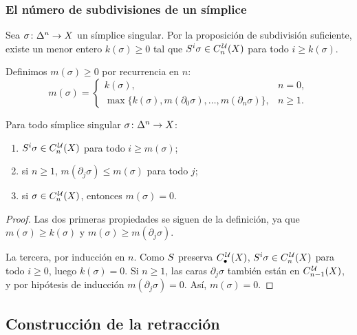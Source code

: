 \begin{frame}[allowframebreaks]
  \frametitle{El número de subdivisiones de un símplice}

  Sea $\sigma\colon\Delta^{n}\to X$ un símplice singular. Por la
  proposición de subdivisión suficiente, existe un menor entero $k(\sigma)\geq0$ tal que
  $S^i\sigma\in C^{\mkern2mu\mathcal{U}}_n(X)$ para todo $i\geq k(\sigma)$.

  \begin{definition}
    Definimos $m(\sigma)\geq0$ por recurrencia en $n$:
    \[
      m(\sigma)=
      \begin{cases}
        k(\sigma), & n=0,\\
        \max\bigl\{k(\sigma),m(\partial_0\sigma),\ldots,m(\partial_n\sigma)\bigr\},
          & n\geq1.
      \end{cases}
    \]
  \end{definition}

  \framebreak

  \begin{lemma}
    Para todo símplice singular $\sigma\colon\Delta^{n}\to X$:
    \begin{enumerate}
      \item $S^i\sigma\in C^{\mkern2mu\mathcal{U}}_n(X)$ para todo $i\geq m(\sigma)$;
      \item si $n\geq1$, $m(\partial_j\sigma)\leq m(\sigma)$ para todo $j$;
      \item si $\sigma\in C^{\mkern2mu\mathcal{U}}_n(X)$, entonces $m(\sigma)=0$.
    \end{enumerate}
  \end{lemma}

  \begin{proof}
    Las dos primeras propiedades se siguen de la definición, ya que
    $m(\sigma)\geq k(\sigma)$ y $m(\sigma)\geq m(\partial_j\sigma)$.

    \medskip

    La tercera, por inducción en $n$. Como $S$ preserva
    $C^{\mkern2mu\mathcal{U}}_\bullet(X)$, $S^i\sigma\in C^{\mkern2mu\mathcal{U}}_n(X)$ para todo $i\geq0$, luego
    $k(\sigma)=0$. Si $n\geq1$, las caras $\partial_j\sigma$ también están en
    $C^{\mkern2mu\mathcal{U}}_{n-1}(X)$, y por hipótesis de inducción $m(\partial_j\sigma)=0$.
    Así, $m(\sigma)=0$.
  \end{proof}
\end{frame}

\subsection{Construcción de la retracción}

